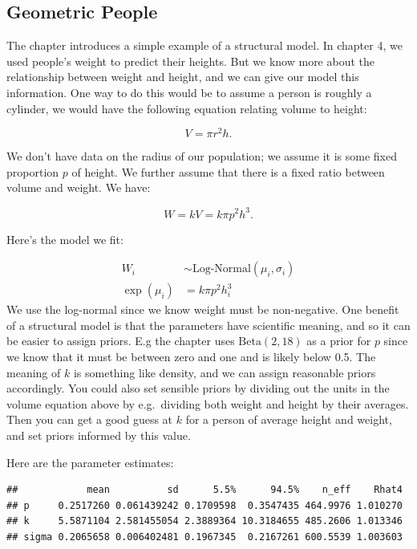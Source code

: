 \documentclass[
]{book}
\begin{document}
\hypertarget{geometric-people}{%
\subsection*{Geometric People}\label{geometric-people}}

The chapter introduces a simple example of a structural model. In chapter 4, we used people's weight to predict their heights. But we know more about the relationship between weight and height, and we can give our model this information. One way to do this would be to assume a person is roughly a cylinder, we would have the following equation relating volume to height:

\[
V = \pi r^2 h.
\]

We don't have data on the radius of our population; we assume it is some fixed proportion \(p\) of height. We further assume that there is a fixed ratio between volume and weight. We have:

\[
W = kV = k\pi p^2 h^3.
\]

Here's the model we fit:

\[
\begin{aligned}
W_{i} &\sim \text{Log-Normal}(\mu_{i},\sigma_{i}) \\
\exp(\mu_i) &= k \pi p^2 h_i^3
\end{aligned}
\]
We use the log-normal since we know weight must be non-negative. One benefit of a structural model is that the parameters have scientific meaning, and so it can be easier to assign priors. E.g the chapter uses \(\text{Beta}(2,18)\) as a prior for \(p\) since we know that it must be between zero and one and is likely below 0.5. The meaning of \(k\) is something like density, and we can assign reasonable priors accordingly.
You could also set sensible priors by dividing out the units in the volume equation above by e.g.~dividing both weight and height by their averages. Then you can get a good guess at \(k\) for a person of average height and weight, and set priors informed by this value.

Here are the parameter estimates:

\begin{verbatim}
##            mean          sd      5.5%      94.5%    n_eff    Rhat4
## p     0.2517260 0.061439242 0.1709598  0.3547435 464.9976 1.010270
## k     5.5871104 2.581455054 2.3889364 10.3184655 485.2606 1.013346
## sigma 0.2065658 0.006402481 0.1967345  0.2167261 600.5539 1.003603
\end{verbatim}
\end{document}
